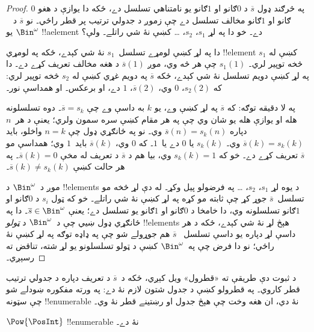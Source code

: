 \documentclass[../../../include/open-logic-section]{subfiles}
\begin{document}
\begin{proof}
په څرګند ډول $\overline{s}$ د $0$ګانو او $1$ګانو يو نامتناهي
تسلسل دے، ځکه دا يوازې د هغو $0$ګانو او $1$ګانو مخالف تسلسل دے
چې زموږ د جدولي ترتيب پر قطر راځي۔ نو $\overline{s}$ د
~$\Bin^\omega$ يو !!a{element} دے۔ خو دا په لړ $s_1$، $s_2$،
\dots{} کښې نۀ شي راتلے۔ ولې؟

دا په لړ کښې لومړے تسلسل~$s_1$ نۀ شي کېدے، ځکه په لومړي
!!{element} کښې له $s_1$ څخه توپير لري۔ $s_1(1)$ چې هر څه وي،
موږ $\overline{s}(1)$ د هغه مخالف تعريف کړے دے۔ دا په لړ کښې
دويم تسلسل نۀ شي کېدے، ځکه $\overline{s}$ په دويم غړي کښې له
$s_2$ څخه توپير لري: که $s_2(2)$، $0$ وي، $\overline{s}(2)$،
$1$ دے، او برعکس۔ او همداسې نور۔

په لا دقيقه توګه: که $\overline{s}$ په لړ کښې وے، يو $k$ به
داسې وے چې $\overline{s} = s_{k}$۔ دوه تسلسلونه هله او يوازې
هله يو شان وي چې په هر مقام کښې سره سمون ولري؛ يعنې د هر~$n$
دپاره $\overline{s}(n) = s_{k}(n)$ وي۔ نو په ځانګړي ډول چې
$n = k$ واخلو، بايد $\overline{s}(k) = s_{k}(k)$ وي۔ $s_k(k)$
يا $0$ دے يا~$1$۔ که $0$ وي، $\overline{s}(k)$ بايد~$1$ وي؛
همداسې مو $\overline{s}$ تعريف کړے دے۔ خو که $s_k(k) = 1$ وي،
بيا هم د $\overline{s}$ د تعريف له مخې $\overline{s}(k) = 0$۔
په هر حالت کښې $\overline{s}(k) \neq s_{k}(k)$۔

موږ د~$\Bin^\omega$ د !!{element}s د يوه لړ $s_1$، $s_2$،
\dots{} په فرضولو پيل وکړ۔ له دې لړ څخه مو تسلسل~$\overline{s}$
جوړ کړ چې ثابته مو کړه په لړ کښې نۀ شي راتلے۔ خو که ټول $s_i$
د $0$ګانو او $1$ګانو تسلسلونه وي، دا خامخا د $0$ګانو او
$1$ګانو يو تسلسل دے؛ يعنې $\overline{s} \in \Bin^\omega$۔ دا په
ځانګړي ډول ښيي چې د~$\Bin^\omega$ د \emph{ټولو} !!{element}s هېڅ
لړ نۀ شي کېدے، ځکه د هر داسې لړ دپاره يو داسې تسلسل
~$\overline{s}$ هم جوړولے شو چې په ډاډه توګه په لړ کښې نۀ راځي؛
نو دا فرض چې په~$\Bin^\omega$ کښې د ټولو تسلسلونو يو لړ شته،
تناقض ته رسېږي۔
\end{proof}

\begin{explain}
د ثبوت دې طريقې ته «قطرول» ويل کېږي، ځکه د~$\overline{s}$ د
تعريف دپاره د جدولي ترتيب قطر کاروي۔ په قطرولو کښې د جدول شتون
لازم نۀ دے: په ورته مفکوره ښودلے شو چې سټونه !!{enumerable} نۀ
دي، ان هغه وخت چې هېڅ جدول او رښتينے قطر نۀ وي۔
\end{explain}

\begin{thm}
$\Pow{\PosInt}$ !!{enumerable} نۀ دے۔
\end{thm}
\end{document}
